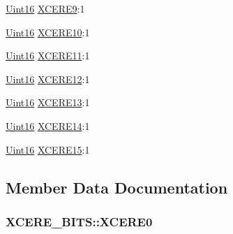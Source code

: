 \begin{DoxyCompactItemize}
\item 
\hyperlink{_d_s_p2833x___device_8h_a59a9f6be4562c327cbfb4f7e8e18f08b}{Uint16} \hyperlink{struct_x_c_e_r_e___b_i_t_s_af836ac77351100499a7698d4d64f56b5}{X\+C\+E\+R\+E9}\+:1
\item 
\hyperlink{_d_s_p2833x___device_8h_a59a9f6be4562c327cbfb4f7e8e18f08b}{Uint16} \hyperlink{struct_x_c_e_r_e___b_i_t_s_a504a49d985fc79458d61a489936e8cfa}{X\+C\+E\+R\+E10}\+:1
\item 
\hyperlink{_d_s_p2833x___device_8h_a59a9f6be4562c327cbfb4f7e8e18f08b}{Uint16} \hyperlink{struct_x_c_e_r_e___b_i_t_s_a7c2bc9ee573735e86f89b2b53a0965d5}{X\+C\+E\+R\+E11}\+:1
\item 
\hyperlink{_d_s_p2833x___device_8h_a59a9f6be4562c327cbfb4f7e8e18f08b}{Uint16} \hyperlink{struct_x_c_e_r_e___b_i_t_s_a4a706ef27bd882a847c11df16b997ae8}{X\+C\+E\+R\+E12}\+:1
\item 
\hyperlink{_d_s_p2833x___device_8h_a59a9f6be4562c327cbfb4f7e8e18f08b}{Uint16} \hyperlink{struct_x_c_e_r_e___b_i_t_s_a26dea34161c6a433e475e8bad3d6fa4a}{X\+C\+E\+R\+E13}\+:1
\item 
\hyperlink{_d_s_p2833x___device_8h_a59a9f6be4562c327cbfb4f7e8e18f08b}{Uint16} \hyperlink{struct_x_c_e_r_e___b_i_t_s_aa310030cabfc4ff8f21530222829eea2}{X\+C\+E\+R\+E14}\+:1
\item 
\hyperlink{_d_s_p2833x___device_8h_a59a9f6be4562c327cbfb4f7e8e18f08b}{Uint16} \hyperlink{struct_x_c_e_r_e___b_i_t_s_a7b55d6c6b325d7e8f63078a1c2cb3645}{X\+C\+E\+R\+E15}\+:1
\end{DoxyCompactItemize}


\subsection{Member Data Documentation}
\hypertarget{struct_x_c_e_r_e___b_i_t_s_a74cb9805107351ca5c203ac9a94c2c35}{}
\subsubsection[{X\+C\+E\+R\+E0}]{ X\+C\+E\+R\+E\+\_\+\+B\+I\+T\+S\+::\+X\+C\+E\+R\+E0}\label{struct_x_c_e_r_e___b_i_t_s_a74cb9805107351ca5c203ac9a94c2c35}
\hypertarget{struct_x_c_e_r_e___b_i_t_s_a1dd27273efef14e741394601d63bb3fe}{}
